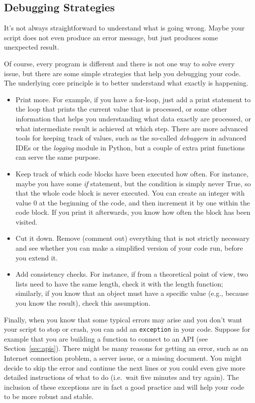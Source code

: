 \subsection{Debugging Strategies}\label{sec:debugging}

It's not always straightforward to understand what is going
wrong. Maybe your script does not even produce an error
message, but just produces some unexpected result.

Of course, every program is different and there is not one
way to solve every issue, but there are some simple strategies
that help you debugging your code. The underlying core
principle is to better understand what exactly is happening.

\begin{itemize}
  \item Print more. For example, if you have a for-loop, just add a print statement to the loop that prints the current value that is processed, or some other information that helps you understanding what data exactly are processed, or what intermediate result is achieved at which step. There are more advanced tools for keeping track of values, such as the so-called \emph{debugger}s in advanced IDEs or the \emph{logging} module in Python, but a couple of extra print functions can serve the same purpose.
  \item Keep track of which code blocks have been executed how often. For instance, maybe you have some \textit{if} statement, but the condition is simply never True, so that the whole code block is never executed. You can create an integer with value 0 at the beginning of the code, and then increment it by one within the code block. If you print it afterwards, you know how often the block has been visited.
  \item Cut it down. Remove (comment out) everything that is not strictly necessary and see whether you can make a simplified version of your code run, before you extend it.
  \item Add consistency checks. For instance, if from a theoretical point of view, two lists need to have the same length, check it with the length function; similarly, if you know that an object must have a specific value (e.g., because you know the result), check this assumption.
\end{itemize}


Finally, when you know that some typical errors may arise and you don't want your script to stop or crash, you can add an \texttt{exception} in your code. Suppose for example that you are building a function to connect to an API (see Section~\ref{sec:apis}). There might be many reasons for getting an error, such as an Internet connection problem, a server issue, or a missing document. You might decide to skip  the error and continue the next lines or  you could even give more detailed instructions of what to do (i.e.\ wait five minutes and try again). The inclusion of these exceptions are in fact a good practice and will help your code to be more robust and stable.

